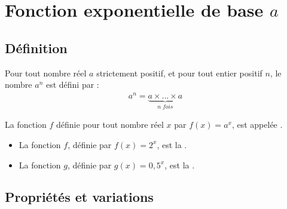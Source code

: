 \documentclass[12pt,a4paper]{article}
\date{}
\title{}
\begin{document}
{}

\section{Fonction exponentielle de base $a$}

\subsection{Définition}
\begin{mydef}
	Pour tout nombre réel $a$ strictement positif, et pour tout entier positif $n$, le nombre $a^n$ est défini par :
	\begin{align*}
		a^n = \underbrace{a \times ... \times a}_{n \; fois}
	\end{align*}
	
	 La fonction $f$ définie pour tout nombre réel $x$ par $f(x)=a^x$, est appelée .
\end{mydef}

\begin{myex}
	\begin{itemize}
		\item La fonction $f$, définie par $f(x)=2^x$, est la . 
		\item La fonction $g$, définie par $g(x)=0,5^x$, est la .
	\end{itemize}
	
\end{myex}


\subsection{Propriétés et variations}
\end{document}
